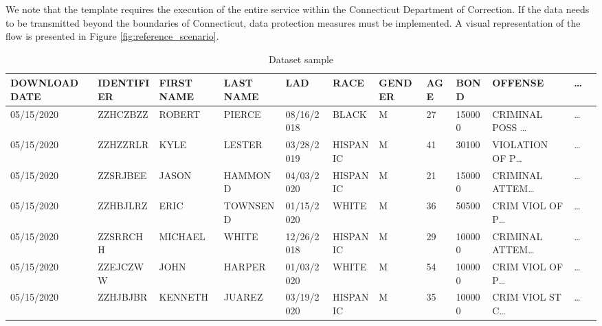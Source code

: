 We note that the template requires the execution of the entire service within the Connecticut Department of Correction.
If the data needs to be transmitted beyond the boundaries of Connecticut, data protection measures must be implemented.
A visual representation of the flow is presented in Figure \ref{fig:reference_scenario}.
\begin{table*}[ht!]
  \caption{Dataset sample}
  \label{tab:dataset}
  \centering
  \begin{adjustbox}{max totalsize={.99\linewidth}{\textheight},center}
    \bgroup
    \def\arraystretch{1.5}
    \begin{tabular}{|l|l|l|l|l|l|l|l|l|l|l|l|}
      \hline
      \textbf{DOWNLOAD DATE} & \textbf{IDENTIFIER} & \textbf{FIRST NAME} & \textbf{LAST NAME} & \textbf{LAD} & \textbf{RACE} & \textbf{GENDER} & \textbf{AGE} & \textbf{BOND} & \textbf{OFFENSE}     & \textbf{\dots} \\ \hline
      05/15/2020             & ZZHCZBZZ            & ROBERT              & PIERCE             & 08/16/2018   & BLACK         & M               & 27           & 150000        & CRIMINAL POSS \dots  & \dots          \\ \hline
      05/15/2020             & ZZHZZRLR            & KYLE                & LESTER             & 03/28/2019   & HISPANIC      & M               & 41           & 30100         & VIOLATION OF P\dots  & \dots          \\ \hline
      05/15/2020             & ZZSRJBEE            & JASON               & HAMMOND            & 04/03/2020   & HISPANIC      & M               & 21           & 150000        & CRIMINAL ATTEM\dots  & \dots          \\ \hline
      05/15/2020             & ZZHBJLRZ            & ERIC                & TOWNSEND           & 01/15/2020   & WHITE         & M               & 36           & 50500         & CRIM VIOL OF P\dots  & \dots          \\ \hline
      05/15/2020             & ZZSRRCHH            & MICHAEL             & WHITE              & 12/26/2018   & HISPANIC      & M               & 29           & 100000        & CRIMINAL ATTEM\dots  & \dots          \\ \hline
      05/15/2020             & ZZEJCZWW            & JOHN                & HARPER             & 01/03/2020   & WHITE         & M               & 54           & 100000        & CRIM VIOL OF P\dots  & \dots          \\ \hline
      05/15/2020             & ZZHJBJBR            & KENNETH             & JUAREZ             & 03/19/2020   & HISPANIC      & M               & 35           & 100000        & CRIM VIOL ST C\dots  & \dots          \\ \hline

\end{tabular}
\end{adjustbox}
\end{table*}
